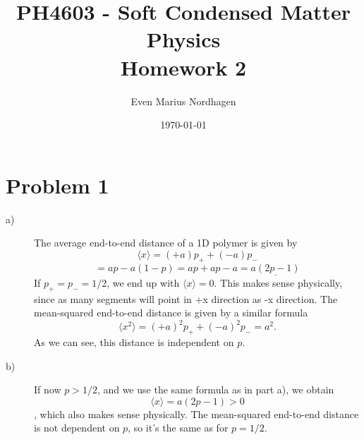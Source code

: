 \documentclass[norsk,a4paper,12pt]{article}
\title{PH4603 - Soft Condensed Matter Physics\\\vspace{2mm} \Large{Homework 2}}
\author{\large Even Marius Nordhagen}
\date\today
\begin{document}
\maketitle

\section*{Problem 1}
\begin{description}
\item [a)] The average end-to-end distance of a 1D polymer is given by
\begin{equation}
\langle x\rangle=(+a)p_++(-a)p_-
\end{equation}
$$=ap-a(1-p)=ap+ap-a=\underline{a(2p-1)}$$
If $p_+=p_-=1/2$, we end up with $\langle x\rangle = 0$. This makes sense physically, since as many segments will point in +x direction as -x direction. The mean-squared end-to-end distance is given by a similar formula
\begin{equation}
\langle x^2\rangle=(+a)^2p_++(-a)^2p_-=a^2.
\end{equation}
As we can see, this distance is independent on $p$.
\item [b)] If now $p>1/2$, and we use the same formula as in part a), we obtain
$$\langle x\rangle=a(2p-1)>0$$, which also makes sense physically. The mean-squared end-to-end distance is not dependent on $p$, so it's the same as for $p=1/2$.

\end{description}
\newpage
\end{document}
